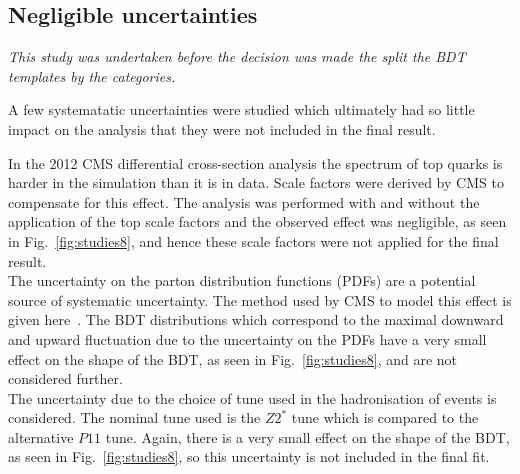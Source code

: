 
\subsection{Negligible uncertainties}
\emph{This study was undertaken before the decision was made the split the BDT templates by the \njets categories.}

A few systematatic uncertainties were studied which ultimately had so little impact on the analysis that they were not included in the final result.

In the 2012 CMS differential cross-section \ttbar analysis \cite{CMS:TopPt} the \pt spectrum of top quarks is harder in the \MADGRAPH simulation than it is in data. Scale factors were derived by CMS to compensate for this effect. The analysis was performed with and without the application of the top \pt scale factors and the observed effect was negligible, as seen in Fig.~\ref{fig:studies8}, and hence these scale factors were not applied for the final result.\\
The uncertainty on the parton distribution functions (PDFs) are a potential source of systematic uncertainty. The method used by CMS to model this effect is given here~\cite{ref:PDFUnc2}. The BDT distributions which correspond to the maximal downward and upward fluctuation due to the uncertainty on the PDFs have a very small effect on the shape of the BDT, as seen in Fig.~\ref{fig:studies8}, and are not considered further.\\
The uncertainty due to the choice of \PYTHIA tune used in the hadronisation of \ttbar events is considered. The nominal tune used is the $Z2^{*}$ tune which is compared to the alternative $P11$ tune. Again, there is a very small effect on the shape of the BDT, as seen in Fig.~\ref{fig:studies8}, so this uncertainty is not included in the final fit.

